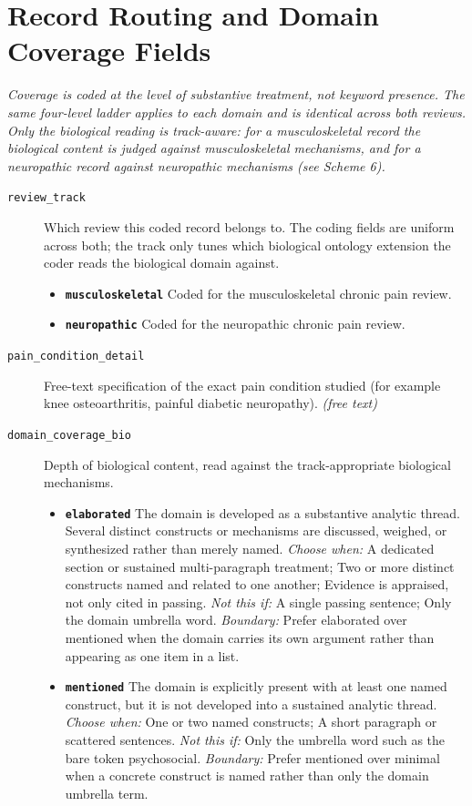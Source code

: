 \documentclass[11pt]{article}
\begin{document}
\section*{Record Routing and Domain Coverage Fields}
{\small\itshape Coverage is coded at the level of substantive treatment, not keyword presence. The same four-level ladder applies to each domain and is identical across both reviews. Only the biological reading is track-aware: for a musculoskeletal record the biological content is judged against musculoskeletal mechanisms, and for a neuropathic record against neuropathic mechanisms (see Scheme 6).}\par\smallskip
\begin{description}
\item[\texttt{review\_track}] Which review this coded record belongs to. The coding fields are uniform across both; the track only tunes which biological ontology extension the coder reads the biological domain against.
  \begin{itemize}[leftmargin=1.3em,itemsep=2pt,topsep=2pt]
  \item \textbf{\texttt{musculoskeletal}} Coded for the musculoskeletal chronic pain review.
  \item \textbf{\texttt{neuropathic}} Coded for the neuropathic chronic pain review.
  \end{itemize}
\item[\texttt{pain\_condition\_detail}] Free-text specification of the exact pain condition studied (for example knee osteoarthritis, painful diabetic neuropathy). \textit{(free text)}
\item[\texttt{domain\_coverage\_bio}] Depth of biological content, read against the track-appropriate biological mechanisms.
  \begin{itemize}[leftmargin=1.3em,itemsep=2pt,topsep=2pt]
  \item \textbf{\texttt{elaborated}} The domain is developed as a substantive analytic thread. Several distinct constructs or mechanisms are discussed, weighed, or synthesized rather than merely named. {\small \textit{Choose when:} A dedicated section or sustained multi-paragraph treatment; Two or more distinct constructs named and related to one another; Evidence is appraised, not only cited in passing. \textit{Not this if:} A single passing sentence; Only the domain umbrella word. \textit{Boundary:} Prefer elaborated over mentioned when the domain carries its own argument rather than appearing as one item in a list.}
  \item \textbf{\texttt{mentioned}} The domain is explicitly present with at least one named construct, but it is not developed into a sustained analytic thread. {\small \textit{Choose when:} One or two named constructs; A short paragraph or scattered sentences. \textit{Not this if:} Only the umbrella word such as the bare token psychosocial. \textit{Boundary:} Prefer mentioned over minimal when a concrete construct is named rather than only the domain umbrella term.}

\end{itemize}
\end{description}
\end{document}
